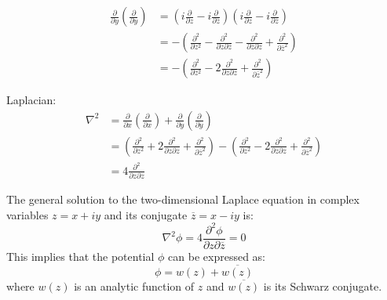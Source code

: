 \begin{equation*}
\begin{split}
\frac{\partial}{\partial y} \left( \frac{\partial}{\partial y} \right) &= \left( i \frac{\partial}{\partial z} - i \frac{\partial}{\partial \overline{z}} \right) \left( i \frac{\partial}{\partial z} - i \frac{\partial}{\partial \overline{z}} \right) \\
&= - \left( \frac{\partial^2}{\partial z^2} - \frac{\partial^2}{\partial z \partial \overline{z}} - \frac{\partial^2}{\partial \overline{z} \partial z} + \frac{\partial^2}{\partial \overline{z}^2} \right) \\
&= - \left( \frac{\partial^2}{\partial z^2} - 2 \frac{\partial^2}{\partial z \partial \overline{z}} + \frac{\partial^2}{\partial \overline{z}^2} \right)
\end{split}
\end{equation*}

Laplacian:
\begin{equation*}
\begin{split}
\nabla^2 &= \frac{\partial}{\partial x} \left( \frac{\partial}{\partial x} \right) + \frac{\partial}{\partial y} \left( \frac{\partial}{\partial y} \right) \\
&= \left( \frac{\partial^2}{\partial z^2} + 2 \frac{\partial^2}{\partial z \partial \overline{z}} + \frac{\partial^2}{\partial \overline{z}^2} \right) - \left( \frac{\partial^2}{\partial z^2} - 2 \frac{\partial^2}{\partial z \partial \overline{z}} + \frac{\partial^2}{\partial \overline{z}^2} \right) \\
&= 4 \frac{\partial^2}{\partial z \partial \overline{z}}
\end{split}
\end{equation*}

The general solution to the two-dimensional Laplace equation in complex variables \( z = x + iy \) and its conjugate \( \overline{z} = x - iy \) is:
\[
\nabla^2 \phi = 4 \frac{\partial^2 \phi}{\partial z \partial \overline{z}} = 0
\]
This implies that the potential \( \phi \) can be expressed as:
\[
\phi = w(z) + \overline{w(z)}
\]
where \( w(z) \) is an analytic function of \( z \) and \( \overline{w(z)} \) is its Schwarz conjugate.

